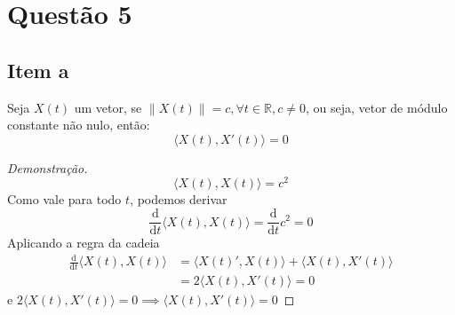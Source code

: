 \documentclass[12pt,letterpaper]{article}
\begin{document}
\section*{Questão 5}
\subsection*{Item a}
\begin{boxlemma}
Seja \(X(t)\) um vetor, se \(\lVert X(t) \rVert = c, \forall t \in \mathbb{R}, c\neq 0\), ou seja, vetor de módulo constante não nulo, então:
\[\langle X(t), X'(t) \rangle = 0\]
\begin{proof}[Demonstração]
\[\langle X(t), X(t) \rangle = c^2\]
Como vale para todo \(t\), podemos derivar
\[ \frac{\mathrm{d}}{\mathrm{d}t}\langle X(t), X(t) \rangle = \frac{\mathrm{d}}{\mathrm{d}t}c^2 = 0 \]
Aplicando a regra da cadeia
\begin{align*}
  \frac{\mathrm{d}}{\mathrm{d}t} \langle X(t), X(t) \rangle &=  \langle X(t)', X(t) \rangle + \langle X(t), X'(t) \rangle \\
  &= 2 \langle X(t), X'(t) \rangle = 0
\end{align*}
e \(2 \langle X(t), X'(t) \rangle = 0 \implies \langle X(t), X'(t) \rangle = 0\)
\end{proof}
\end{boxlemma}
\end{document}
